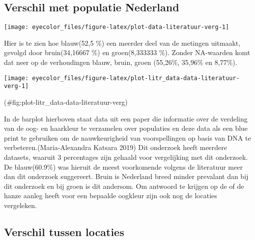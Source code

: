 \documentclass[
]{article}
\let\origfigure\figure
\let\endorigfigure\endfigure
\renewenvironment{figure}[1][2] {
    \expandafter\origfigure\expandafter[H]
} {
    \endorigfigure
}
\begin{document}
\hypertarget{verschil-met-populatie-nederland}{%
\subsection{Verschil met populatie Nederland}\label{verschil-met-populatie-nederland}}

\begin{figure}
\texttt{[image: eyecolor\_files/figure-latex/plot-data-literatuur-verg-1]} \caption{Oogkleuren tegenover frequenties. Het totaal aantal waarnemingen van het rechteroogkleur. De door meerderheid waargenomen kleur onder analisten. NA als er geen meerderheid was.}\label{fig:plot-data-literatuur-verg}
\end{figure}

Hier is te zien hoe blauw(52,5 \%) een meerder deel van de metingen
uitmaakt, gevolgd door bruin(34,16667 \%) en groen(8,333333 \%). Zonder
NA-waarden komt dat neer op de verhoudingen blauw, bruin, groen (55,26\%,
35,96\% en 8,77\%).

\begin{figure}
\texttt{[image: eyecolor\_files/figure-latex/plot-litr\_data-data-literatuur-verg-1]} \caption{Oogkleur tegen percentages voor data uit literatuur en dit onderzoek. Meerderheid waargenomen door analisten van het rechter oogkleur. Oogkleur percentages uit fsigenetics - "True colors: A literature review on the spatial distribution of eye and hair pigmentation" via researchgate}(\#fig:plot-litr_data-data-literatuur-verg)
\end{figure}

In de barplot hierboven staat data uit een paper die informatie over de
verdeling van de oog- en haarkleur te verzamelen over populaties en deze
data als een blue print te gebruiken om de nauwkeurigheid van
voorspellingen op basis van DNA te verbeteren.(Maria-Alexandra Katsara 2019) Dit
onderzoek heeft meerdere datasets, waaruit 3 percentages zijn gehaald
voor vergelijking met dit onderzoek. De blauw(60.9\%) was hieruit de
meest voorkomende volgens de literatuur meer dan dit onderzoek
suggereert. Bruin is Nederland breed minder prevalant dan bij dit
onderzoek en bij groen is dit andersom. Om antwoord te krijgen op de of
de hanze aanleg heeft voor een bepaalde oogkleur zijn ook nog de
locaties vergeleken.

\hypertarget{verschil-tussen-locaties}{%
\subsection{Verschil tussen locaties}\label{verschil-tussen-locaties}}
\end{document}
